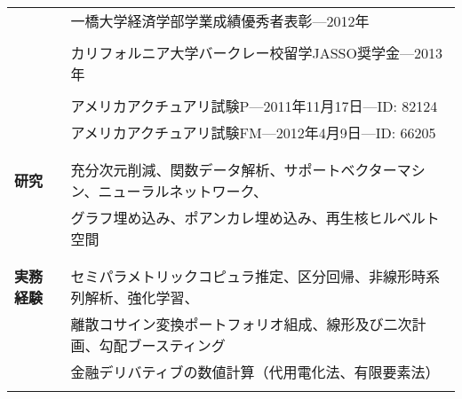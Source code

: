 \documentclass[utf8,letterpaper,oneside]{article}
\begin{document}
\begin{center}
\begin{tabular}{l l}
                      & 一橋大学経済学部学業成績優秀者表彰---2012年                                                    \\
                      &                                                                                                \\
                      & カリフォルニア大学バークレー校留学JASSO奨学金---2013年                                         \\
                      &                                                                                                \\
                      & アメリカアクチュアリ試験P---2011年11月17日---ID: 82124                                         \\
                      & アメリカアクチュアリ試験FM---2012年4月9日---ID: 66205                                          \\
                      &                                                                                                \\ \hline
                      &                                                                                                \\
  \textbf{研究}       & 充分次元削減、関数データ解析、サポートベクターマシン、ニューラルネットワーク、                 \\
                      & グラフ埋め込み、ポアンカレ埋め込み、再生核ヒルベルト空間                                       \\
                      &                                                                                                \\ \hline
                      &                                                                                                \\
  \textbf{実務経験}   & セミパラメトリックコピュラ推定、区分回帰、非線形時系列解析、強化学習、                         \\
                      & 離散コサイン変換ポートフォリオ組成、線形及び二次計画、勾配ブースティング                       \\
                      & 金融デリバティブの数値計算（代用電化法、有限要素法）                                           \\
                      &                                                                                                \\ \hline

\end{tabular}
\end{center}
\end{document}
